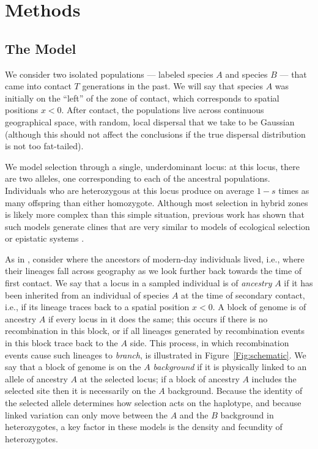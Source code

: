 \documentclass[11pt,letterpaper]{article}
\begin{document}
\section*{Methods}

\subsection*{The Model}

We consider two isolated populations
--- labeled species $A$ and species $B$ ---   %
that came into contact $T$ generations in the past.  
We will say that species $A$ was initially on the ``left'' of the zone of contact, which corresponds to spatial positions $x<0$.  
After contact, the populations live across continuous geographical space,
with random, local dispersal that we take to be Gaussian
(although this should not affect the conclusions if the true dispersal distribution is not too fat-tailed).

We model selection through a single, underdominant locus:
at this locus, there are two alleles, one corresponding to each of the ancestral populations.
Individuals who are heterozygous at this locus produce on average $1-s$ times as many offspring than either homozygote.
Although most selection in hybrid zones is likely more complex than this simple situation, 
previous work has shown that such models generate clines that are very similar to models of ecological selection or epistatic systems \citep{Kruuk1999,Barton2000a}.

As in \citet{sedghifar2015spatial}, consider where the ancestors of modern-day individuals lived,
i.e., where their lineages fall across geography as we look further back towards the time of first contact.
We say that a locus in a sampled individual is of \emph{ancestry} $A$ if it has been inherited from an individual of species $A$ at the time of secondary contact,
i.e., if its lineage traces back to a spatial position $x<0$.
A block of genome is of ancestry $A$ if every locus in it does the same; 
	this occurs if there is no recombination in this block, or if all lineages generated by recombination events 
	in this block trace back to the $A$ side. 
This process, in which recombination events cause such lineages to \emph{branch},
is illustrated in Figure~\ref{Fig:schematic}.
We say that a block of genome is on the $A$ \emph{background} if it is physically linked to an allele of ancestry $A$ at the selected locus;
if a block of ancestry $A$ includes the selected site then it is necessarily on the $A$ background.
Because the identity of the selected allele determines how selection acts on the haplotype,
and because linked variation can only move between the $A$ and the $B$ background in heterozygotes, 
a key factor in these models is the density and fecundity of heterozygotes.
\end{document}
